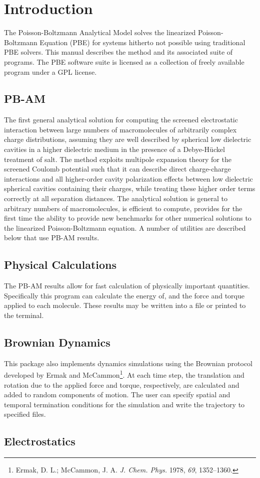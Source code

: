 
\chapter{Introduction}



The Poisson-Boltzmann Analytical Model solves the 
linearized Poisson-Boltzmann Equation (PBE) for systems hitherto not possible 
using traditional PBE solvers. 
This manual describes the method and its associated suite of programs. 
The PBE software suite is licensed as a collection of freely available program 
under a GPL license. 




\section{PB-AM} The first general analytical solution for computing the screened electrostatic interaction between large numbers of macromolecules of arbitrarily complex charge distributions, assuming they are well described by spherical low dielectric cavities in a higher dielectric medium in the presence of a Debye-H{\"u}ckel treatment of salt. The method exploits multipole expansion theory for the screened Coulomb potential such that it can describe direct charge-charge interactions and all higher-order cavity polarization effects between low dielectric spherical cavities containing their charges, while treating these higher order terms correctly at all separation distances. The analytical solution is general to arbitrary numbers of macromolecules, is efficient to compute, provides for the first time the ability to provide new benchmarks for other numerical solutions to the linearized Poisson-Boltzmann equation. A number of utilities are described below that use PB-AM results.

\section{Physical Calculations} The PB-AM results allow for fast calculation of physically important quantities. Specifically this program can calculate the energy of, and the force and torque applied to each molecule. These results may be written into a file or printed to the terminal.

\section{Brownian Dynamics} This package also implements dynamics simulations using the Brownian protocol developed by Ermak and McCammon\footnote{Ermak, D. L.; McCammon, J. A. \textit{J. Chem. Phys.} 1978, \textit{69}, 1352\---1360.}. At each time step, the translation and rotation due to the applied force and torque, respectively, are calculated and added to random components of motion. The user can specify spatial and temporal termination conditions for the simulation and write the trajectory to specified files.

\section{Electrostatics}



\clearpage
